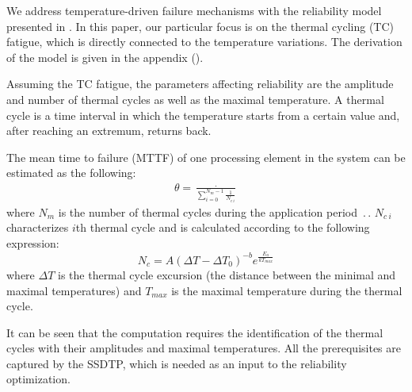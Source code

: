 We address temperature-driven failure mechanisms with the reliability model presented in \cite{huang2009, xiang2010}. In this paper, our particular focus is on the thermal cycling (TC) fatigue, which is directly connected to the temperature variations. The derivation of the model is given in the appendix ().

Assuming the TC fatigue, the parameters affecting reliability are the amplitude and number of thermal cycles as well as the maximal temperature. A thermal cycle is a time interval in which the temperature starts from a certain value and, after reaching an extremum, returns back.

The mean time to failure (MTTF) of one processing element in the system can be estimated as the following:
\begin{align} \label{eq:one-mttf}
  \theta = \frac{\period}{\sum_{i=0}^{N_m - 1} \frac{1}{N_{c \: i}}}
\end{align}
where $N_m$ is the number of thermal cycles during the application period $\period$. $N_{c \: i}$ characterizes $i$th thermal cycle and is calculated according to the following expression:
\begin{equation} \label{eq:cycles-to-failure}
  N_c = A (\Delta T - \Delta T_0)^{-b} e^{\frac{E_a}{k T_{max}}}
\end{equation}
where $\Delta T$ is the thermal cycle excursion (the distance between the minimal and maximal temperatures) and $T_{max}$ is the maximal temperature during the thermal cycle.

It can be seen that the computation requires the identification of the thermal cycles with their amplitudes and maximal temperatures. All the prerequisites are captured by the SSDTP, which is needed as an input to the reliability optimization.
